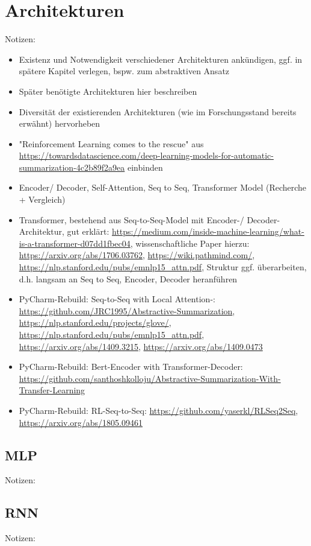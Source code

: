 \section{Architekturen}
Notizen:
\begin{itemize}
	\item Existenz und Notwendigkeit verschiedener Architekturen ankündigen, ggf. in spätere Kapitel verlegen, bspw. zum abstraktiven Ansatz
	\item Später benötigte Architekturen hier beschreiben
	\item Diversität der existierenden Architekturen (wie im Forschungsstand bereits erwähnt) hervorheben
	\item "Reinforcement Learning comes to the rescue" aus \url{https://towardsdatascience.com/deep-learning-models-for-automatic-summarization-4c2b89f2a9ea} einbinden
	\item Encoder/ Decoder, Self-Attention, Seq to Seq, Transformer Model (Recherche + Vergleich)
	\item Transformer, bestehend aus Seq-to-Seq-Model mit Encoder-/ Decoder-Architektur, gut erklärt: \url{https://medium.com/inside-machine-learning/what-is-a-transformer-d07dd1fbec04}, wissenschaftliche Paper hierzu: \url{https://arxiv.org/abs/1706.03762}, \url{https://wiki.pathmind.com/}, \url{https://nlp.stanford.edu/pubs/emnlp15_attn.pdf}, Struktur ggf. überarbeiten, d.h. langsam an Seq to Seq, Encoder, Decoder heranführen
	\item PyCharm-Rebuild: Seq-to-Seq with Local Attention-: \url{https://github.com/JRC1995/Abstractive-Summarization}, \url{https://nlp.stanford.edu/projects/glove/}, \url{https://nlp.stanford.edu/pubs/emnlp15_attn.pdf}, \url{https://arxiv.org/abs/1409.3215}, \url{https://arxiv.org/abs/1409.0473}
	\item PyCharm-Rebuild: Bert-Encoder with Transformer-Decoder: \url{https://github.com/santhoshkolloju/Abstractive-Summarization-With-Transfer-Learning}
	\item PyCharm-Rebuild: RL-Seq-to-Seq: \url{https://github.com/yaserkl/RLSeq2Seq}, \url{https://arxiv.org/abs/1805.09461}
\end{itemize}


\subsection{MLP}
Notizen:


\subsection{RNN}
Notizen:


